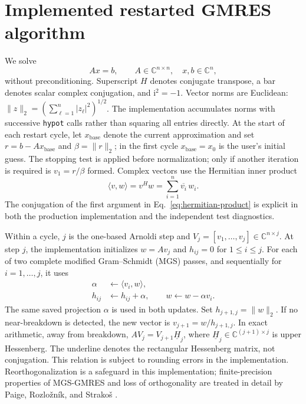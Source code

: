 \section{Implemented restarted GMRES algorithm}

We solve
\begin{equation}
    A x = b, \qquad A\in\mathbb{C}^{n\times n},
    \quad x,b\in\mathbb{C}^{n},
\end{equation}
without preconditioning. Superscript $H$ denotes conjugate transpose, a bar denotes
scalar complex conjugation, and $\mathrm{i}^2=-1$. Vector norms are Euclidean:
$\lVert z\rVert_2=(\sum_{\ell=1}^n |z_\ell|^2)^{1/2}$. The implementation
accumulates norms with successive \texttt{hypot} calls rather than squaring all
entries directly. At the start of each restart cycle, let $x_{\mathrm{base}}$
denote the current approximation and set $r=b-Ax_{\mathrm{base}}$ and
$\beta=\lVert r\rVert_2$; in the first cycle $x_{\mathrm{base}}=x_0$ is the
user's initial guess. The stopping test is applied before normalization;
only if another iteration is required is $v_1=r/\beta$ formed. Complex vectors
use the Hermitian inner product
\begin{equation}
    \langle v,w\rangle = v^{H}w
    = \sum_{i=1}^{n}\overline{v_i}\,w_i.
    \label{eq:hermitian-product}
\end{equation}
The conjugation of the first argument in Eq.~\eqref{eq:hermitian-product} is
explicit in both the production implementation and the independent test
diagnostics.

Within a cycle, $j$ is the one-based Arnoldi step and
$V_j=[v_1,\ldots,v_j]\in\mathbb{C}^{n\times j}$. At step $j$, the implementation
initializes $w=Av_j$ and $h_{ij}=0$ for $1\leq i\leq j$. For each of two complete
modified Gram--Schmidt (MGS) passes, and sequentially for $i=1,\ldots,j$, it uses
\begin{align}
    \alpha &\leftarrow \langle v_i,w\rangle,\\
    h_{ij} &\leftarrow h_{ij}+\alpha,\qquad
    w\leftarrow w-\alpha v_i.
\end{align}
The same saved projection $\alpha$ is used in both updates. Set
$h_{j+1,j}=\lVert w\rVert_2$. If no near-breakdown is detected, the new vector is
$v_{j+1}=w/h_{j+1,j}$. In exact arithmetic, away from breakdown,
$AV_j=V_{j+1}\underline{H}_j$, where
$\underline{H}_j\in\mathbb{C}^{(j+1)\times j}$ is upper Hessenberg. The underline
denotes the rectangular Hessenberg matrix, not conjugation. This relation is
subject to rounding errors in the implementation. Reorthogonalization is a safeguard in
this implementation; finite-precision properties of MGS-GMRES and loss of
orthogonality are treated in detail by Paige, Rozlo\v{z}n\'{i}k, and
Strako\v{s} \cite{paige_rozloznik_strakos_2006}.

